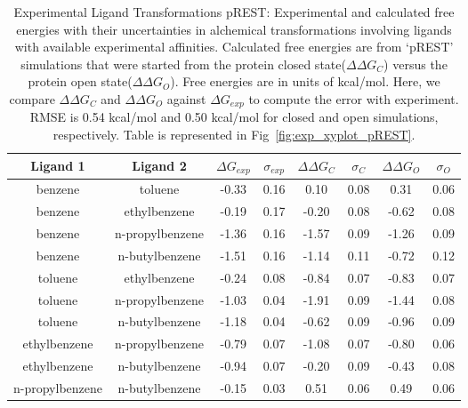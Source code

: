 \begin{table}[!htb]
\centering
\caption{Experimental Ligand Transformations pREST:
Experimental and calculated free energies with their uncertainties in alchemical transformations involving ligands with available experimental affinities.
Calculated free energies are from `pREST' simulations that were started from the protein closed state(\boldmath$\Delta\Delta G_{C}$) versus the protein open state(\boldmath$\Delta\Delta G_{O}$). 
 Free energies are in units of kcal/mol.
 Here, we compare \boldmath$\Delta\Delta G_{C}$ and \boldmath$\Delta\Delta G_{O}$ against \boldmath$\Delta G_{exp}$ to compute the error with experiment.
 RMSE is 0.54 kcal/mol and 0.50 kcal/mol for closed and open simulations, respectively.
 Table is represented in Fig~\ref{fig:exp_xyplot_pREST}.
}
\label{tbl:exp_pREST_set}
\begin{tabular}{|c|c|c|c|c|c|c|c|}
\hline
\textbf{Ligand 1} & \textbf{Ligand 2} & \boldmath$\Delta G_{exp}$  & \boldmath$\sigma_{exp}$ & \boldmath$\Delta\Delta G_{C}$ & \boldmath$\sigma_{C}$ & \boldmath$\Delta\Delta G_{O}$ & \boldmath$\sigma_{O}$ \\ \hline
benzene         & toluene         & -0.33 & 0.16  & 0.10  & 0.08  & 0.31  & 0.06          \\ \hline
benzene         & ethylbenzene    &-0.19  & 0.17  & -0.20 & 0.08  & -0.62 & 0.08          \\ \hline
benzene         & n-propylbenzene & -1.36 & 0.16  & -1.57 & 0.09  & -1.26 & 0.09         \\ \hline
benzene         & n-butylbenzene  & -1.51 & 0.16  & -1.14 & 0.11  & -0.72 & 0.12         \\ \hline
toluene         & ethylbenzene    & -0.24 & 0.08  & -0.84 & 0.07  & -0.83 & 0.07          \\ \hline
toluene         & n-propylbenzene & -1.03 & 0.04  & -1.91 & 0.09  & -1.44 & 0.08          \\ \hline
toluene         & n-butylbenzene  & -1.18 & 0.04  & -0.62 & 0.09  & -0.96 & 0.09          \\ \hline
ethylbenzene    & n-propylbenzene & -0.79 & 0.07  & -1.08 & 0.07  & -0.80 & 0.06         \\ \hline
ethylbenzene    & n-butylbenzene  & -0.94 & 0.07  & -0.20 & 0.09  & -0.43 & 0.08         \\ \hline
n-propylbenzene & n-butylbenzene  & -0.15 & 0.03  & 0.51  & 0.06  & 0.49  & 0.06       \\ \hline
\end{tabular}
\end{table}

